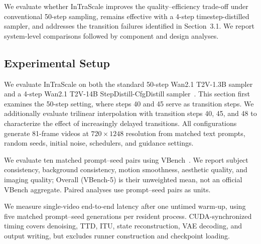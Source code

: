 \documentclass[letterpaper]{article} %
\begin{document}
We evaluate whether InTraScale improves the quality--efficiency trade-off
under conventional 50-step sampling, remains effective with a
4-step timestep-distilled sampler, and addresses the transition
failures identified in
Section~3.1. We report system-level comparisons followed by component and 
design analyses.

\subsection{Experimental Setup}
\label{sec:experimental_setup}

We evaluate InTraScale on both the standard 50-step Wan2.1 T2V-1.3B
sampler~\citep{wan2025} and a 4-step Wan2.1 T2V-14B
StepDistill-CfgDistill sampler~\citep{lightx2v2025}.
This section first examines the 50-step setting, where steps 40
and 45 serve as transition steps. We additionally evaluate trilinear
interpolation with transition steps 40, 45, and 48 to characterize the
effect of increasingly delayed transitions. All configurations generate
81-frame videos at \(720\times1248\) resolution from matched text prompts,
random seeds, initial noise, schedulers, and guidance settings.

We evaluate ten matched prompt--seed pairs using VBench~\citep{huang2024vbench}.
We report subject consistency, background consistency, motion smoothness,
aesthetic quality, and imaging quality; Overall (VBench-5) is their unweighted
mean, not an official VBench aggregate. Paired analyses use prompt--seed pairs
as units.

We measure single-video end-to-end latency after one untimed warm-up,
using five matched prompt--seed generations per resident process. CUDA-synchronized
timing covers denoising, TTD, ITU, state reconstruction, VAE decoding, and output
writing, but excludes runner construction and checkpoint loading.
\end{document}

